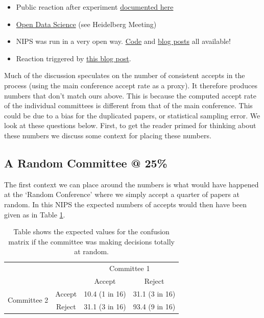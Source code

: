 \begin{itemize}
\item
  Public reaction after experiment
  \href{http://inverseprobability.com/2015/01/16/blogs-on-the-nips-experiment/}{documented
  here}
\item
  \href{http://inverseprobability.com/2014/07/01/open-data-science/}{Open
  Data Science} (see Heidelberg Meeting)
\item
  NIPS was run in a very open way.
  \href{https://github.com/sods/conference}{Code} and
  \href{http://inverseprobability.com/2014/12/16/the-nips-experiment/}{blog
  posts} all available!
\item
  Reaction triggered by
  \href{http://blog.mrtz.org/2014/12/15/the-nips-experiment.html}{this
  blog post}.
\end{itemize}

Much of the discussion speculates on the number of consistent accepts in
the process (using the main conference accept rate as a proxy). It
therefore produces numbers that don't match ours above. This is because
the computed accept rate of the individual committees is different from
that of the main conference. This could be due to a bias for the
duplicated papers, or statistical sampling error. We look at these
questions below. First, to get the reader primed for thinking about
these numbers we discuss some context for placing these numbers.

\hypertarget{a-random-committee-25}{%
\subsection{A Random Committee @ 25\%}\label{a-random-committee-25}}

\begin{flushright}
\end{flushright}

The first context we can place around the numbers is what would have
happened at the `Random Conference' where we simply accept a quarter of
papers at random. In this NIPS the expected numbers of accepts would
then have been given as in Table \ref{table-random-committee}.

\begin{table}[htb]
\caption{Table shows the expected values for the confusion matrix if the committee was making decisions totally at random.}
\label{table-random-committee}



  \begin{tabular}{lc|c|c|}
  & & \multicolumn{2}{c}{Committee 1} \\
  & & Accept & Reject \\
  \multirow{2}{*}{Committee 2} & Accept & 10.4 (1 in 16) & 31.1 (3 in 16) \\ \hline
  & Reject & 31.1 (3 in 16) & 93.4 (9 in 16) 
  \end{tabular}
\end{table}

